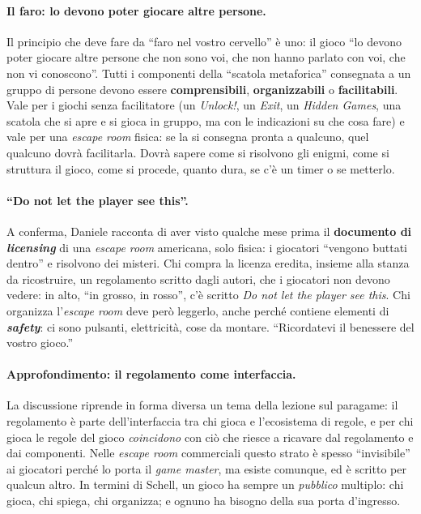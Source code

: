 \paragraph{Il faro: lo devono poter giocare altre persone.} Il principio che deve fare da
``faro nel vostro cervello'' è uno: il gioco ``lo devono poter giocare altre persone che
non sono voi, che non hanno parlato con voi, che non vi conoscono''. Tutti i componenti
della ``scatola metaforica'' consegnata a un gruppo di persone devono essere
\textbf{comprensibili}, \textbf{organizzabili} o \textbf{facilitabili}. Vale per i giochi
senza facilitatore (un \emph{Unlock!}, un \emph{Exit}, un \emph{Hidden Games}, una
scatola che si apre e si gioca in gruppo, ma con le indicazioni su che cosa fare) e vale
per una \emph{escape room} fisica: se la si consegna pronta a qualcuno, quel qualcuno
dovrà facilitarla. Dovrà sapere come si risolvono gli enigmi, come si struttura il gioco,
come si procede, quanto dura, se c'è un timer o se metterlo.

\paragraph{``Do not let the player see this''.} A conferma, Daniele racconta di aver
visto qualche mese prima il \textbf{documento di \emph{licensing}} di una \emph{escape
room} americana, solo fisica: i giocatori ``vengono buttati dentro'' e risolvono dei
misteri. Chi compra la licenza eredita, insieme alla stanza da ricostruire, un
regolamento scritto dagli autori, che i giocatori non devono vedere: in alto, ``in
grosso, in rosso'', c'è scritto \emph{Do not let the player see this}. Chi organizza
l'\emph{escape room} deve però leggerlo, anche perché contiene elementi di
\textbf{\emph{safety}}: ci sono pulsanti, elettricità, cose da montare. ``Ricordatevi il
benessere del vostro gioco.''

\paragraph{Approfondimento: il regolamento come interfaccia.} La discussione riprende in
forma diversa un tema della lezione sul paragame: il regolamento è parte dell'interfaccia
tra chi gioca e l'ecosistema di regole, e per chi gioca le regole del gioco
\emph{coincidono} con ciò che riesce a ricavare dal regolamento e dai componenti.
Nelle \emph{escape room} commerciali questo strato è spesso ``invisibile'' ai giocatori
perché lo porta il \emph{game master}, ma esiste comunque, ed è scritto per qualcun
altro. In termini di Schell, un gioco ha sempre un \emph{pubblico} multiplo: chi gioca,
chi spiega, chi organizza; e ognuno ha bisogno della sua porta d'ingresso.

